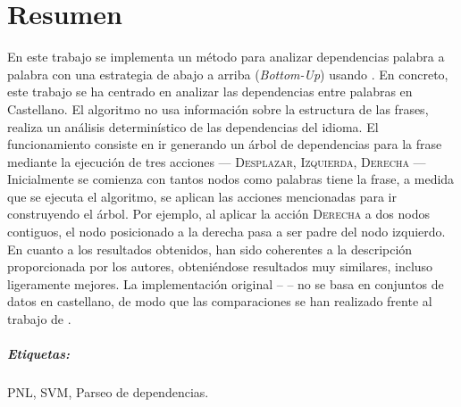 \begingroup
\let\clearpage\relax
\let\cleardoublepage\relax
\let\cleardoublepage\relax

\chapter*{Resumen}
En este trabajo se implementa un método para analizar dependencias palabra a
palabra con una estrategia de abajo a arriba (\textit{Bottom-Up}) usando
. En concreto, este trabajo se ha centrado en analizar las
dependencias entre palabras en Castellano. El algoritmo no usa información sobre
la estructura de las frases, realiza un análisis determinístico de las
dependencias del idioma. El funcionamiento consiste en ir generando un árbol de
dependencias para la frase mediante la ejecución de tres acciones ---
\textsc{Desplazar, Izquierda, Derecha} --- Inicialmente se comienza con tantos
nodos como palabras tiene la frase, a medida que se ejecuta el algoritmo, se
aplican las acciones mencionadas para ir construyendo el árbol. Por ejemplo, al
aplicar la acción \textsc{Derecha} a dos nodos contiguos, el nodo posicionado a
la derecha pasa a ser padre del nodo izquierdo. En cuanto a los resultados
obtenidos, han sido coherentes a la descripción proporcionada por los autores,
obteniéndose resultados muy similares, incluso ligeramente mejores. La
implementación original -- \citet{yamada2003} -- no se basa en conjuntos de
datos en castellano, de modo que las comparaciones se han realizado frente al
trabajo de \citet{rohit2016}.

\paragraph{Etiquetas:} PNL, SVM, Parseo de dependencias.

\vfill

